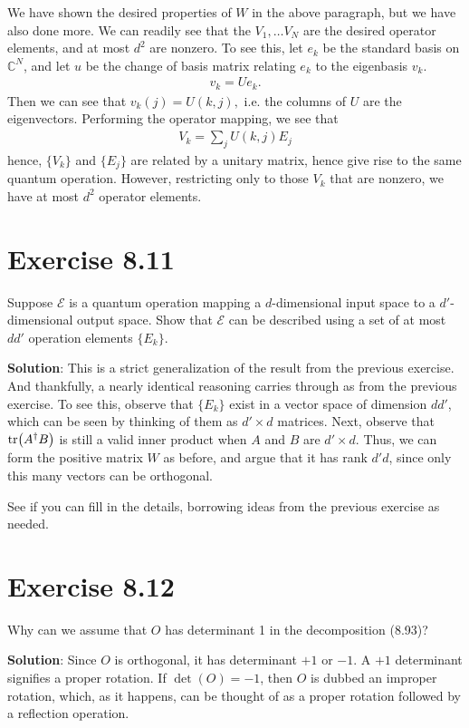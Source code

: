 \documentclass{book}
\begin{document}
    We have shown the desired properties of $W$ in the above paragraph, but we have also done more. We can readily see that the $V_1, \dots V_N$ are the desired operator elements, and at most $d^2$ are nonzero. To see this, let $e_k$ be the standard basis on $\mathbb{C}^N$, and let $u$ be the change of basis matrix relating $e_k$ to the eigenbasis $v_k$.
    \begin{align}
        v_k = U e_k.
    \end{align}
    Then we can see that $v_k (j) = U(k,j),$ i.e. the columns of $U$ are the eigenvectors. Performing the operator mapping, we see that 
    \begin{align}
        V_k = \sum_j U(k,j) E_j
    \end{align}
    hence, $\{V_k\}$ and $\{E_j\}$ are related by a unitary matrix, hence give rise to the same quantum operation. However, restricting only to those $V_k$ that are nonzero, we have at most $d^2$ operator elements.

\section*{Exercise 8.11}
    Suppose $\mathcal{E}$ is a quantum operation mapping a $d$-dimensional input space to a $d'$-dimensional output space. Show that $\mathcal{E}$ can be described using a set of at most $d d'$ operation elements $\{E_k\}$.

    \textbf{Solution}: This is a strict generalization of the result from the previous exercise. And thankfully, a nearly identical reasoning carries through as from the previous exercise. To see this, observe that $\{E_k\}$ exist in a vector space of dimension $d d'$, which can be seen by thinking of them as $d' \times d$ matrices. Next, observe that $\tr(A^\dagger B)$ is still a valid inner product when $A$ and $B$ are $d'\times d$. Thus, we can form the positive matrix $W$ as before, and argue that it has rank $d' d$, since only this many vectors can be orthogonal. 

    See if you can fill in the details, borrowing ideas from the previous exercise as needed. 

\section*{Exercise 8.12}
    Why can we assume that $O$ has determinant 1 in the decomposition (8.93)?

    \textbf{Solution}: Since $O$ is orthogonal, it has determinant $+1$ or $-1$. A $+1$ determinant signifies a proper rotation. If $\det(O) = -1$, then $O$ is dubbed an improper rotation, which, as it happens, can be thought of as a proper rotation followed by a reflection operation. 
\end{document}
